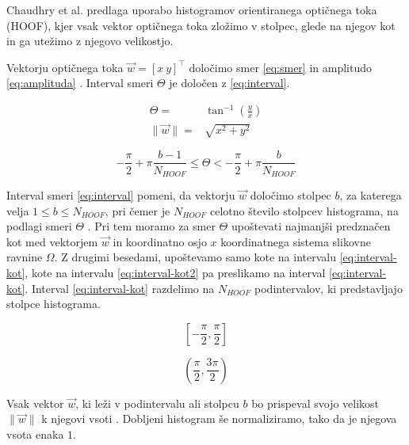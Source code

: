 Chaudhry et al. \cite{chaudhry2009histograms} predlaga uporabo histogramov orientiranega optičnega toka (HOOF), kjer vsak vektor optičnega toka zložimo v stolpec, glede na njegov kot in ga utežimo z njegovo velikostjo.

Vektorju optičnega toka $\vec{w} = [x~y]^\top$ določimo smer \eqref{eq:smer} in amplitudo \eqref{eq:amplituda} \cite{chaudhry2009histograms}. Interval smeri $\Theta$ je določen z \eqref{eq:interval}. 

\begin{align}
	\Theta = & \tan^{-1}\left( \frac{y}{x} \right) \label{eq:smer} \\
    \| \vec{w} \| = & \sqrt{x^2 + y^2} \label{eq:amplituda}
\end{align}

\begin{equation}\label{eq:interval}
	-\frac{\pi}{2} + \pi \frac{b - 1}{N_{HOOF}} \leq \Theta < - \frac{\pi}{2} + \pi \frac{b}{N_{HOOF}}
\end{equation}

Interval smeri \eqref{eq:interval} pomeni, da vektorju $\vec{w}$ določimo stolpec $b$, za katerega velja $1 \leq b \leq N_{HOOF}$, pri čemer je $N_{HOOF}$ celotno število stolpcev histograma, na podlagi smeri $\Theta$ \cite{chaudhry2009histograms}. Pri tem moramo za smer $\Theta$ upoštevati najmanjši predznačen kot med vektorjem $\vec{w}$ in koordinatno osjo $x$ koordinatnega sistema slikovne ravnine $\mathit{\Omega}$. Z drugimi besedami, upoštevamo samo kote na intervalu \eqref{eq:interval-kot}, kote na intervalu \eqref{eq:interval-kot2} pa preslikamo na interval \eqref{eq:interval-kot}. Interval \eqref{eq:interval-kot} razdelimo na $N_{HOOF}$ podintervalov, ki predstavljajo stolpce histograma. 

\begin{equation}\label{eq:interval-kot}
	\left[-\frac{\pi}{2}, \frac{\pi}{2}\right]
\end{equation}

\begin{equation}\label{eq:interval-kot2}
	\left(\frac{\pi}{2},\frac{3\pi}{2}\right)
\end{equation}

Vsak vektor $\vec{w}$, ki leži v podintervalu ali stolpcu $b$ bo prispeval svojo velikost $\|\vec{w} \|$ k njegovi vsoti \cite{chaudhry2009histograms}. Dobljeni histogram še normaliziramo, tako da je njegova vsota enaka $1$.





